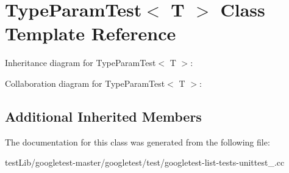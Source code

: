 \hypertarget{classTypeParamTest}{}\section{Type\+Param\+Test$<$ T $>$ Class Template Reference}
\label{classTypeParamTest}


Inheritance diagram for Type\+Param\+Test$<$ T $>$\+:


Collaboration diagram for Type\+Param\+Test$<$ T $>$\+:
\subsection*{Additional Inherited Members}


The documentation for this class was generated from the following file\+:\begin{DoxyCompactItemize}
\item 
test\+Lib/googletest-\/master/googletest/test/googletest-\/list-\/tests-\/unittest\+\_\+.\+cc\end{DoxyCompactItemize}
